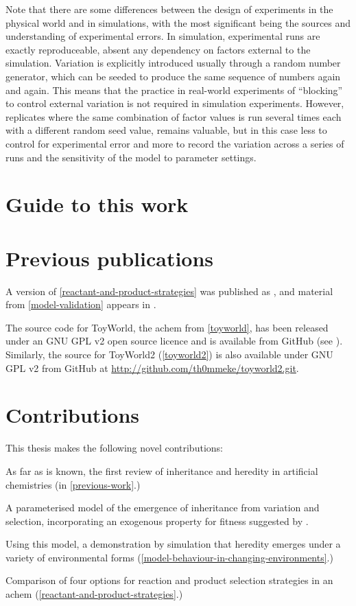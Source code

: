 Note that there are some differences between the design of experiments in the physical world and in simulations, with the most significant being the sources and understanding of experimental errors. In simulation, experimental runs are exactly reproduceable, absent any dependency on factors external to the simulation. Variation is explicitly introduced usually through a random number generator, which can be seeded to produce the same sequence of numbers again and again. This means that the practice in real-world experiments of ``blocking'' to control external variation is not required in simulation experiments. However, \gls{replicate}s where the same combination of factor values is run several times each with a different random seed value, remains valuable, but in this case less to control for experimental error and more to record the variation across a series of runs and the sensitivity of the model to parameter settings.

\section{Guide to this work}


\section{Previous publications}\label{previous-publications}

A version of \cref{reactant-and-product-strategies} was published as \textcite{Young2015}, and material from \cref{model-validation} appears in \textcite{Young2013}.

The source code for ToyWorld, the \gls{achem} from \cref{toyworld}, has been released under an GNU GPL v2 open source licence and is available from GitHub (see \cite{toyworld}). Similarly, the source for ToyWorld2 (\cref{toyworld2}) is also available under GNU GPL v2 from GitHub at \url{http://github.com/th0mmeke/toyworld2.git}.

\section{Contributions}\label{contributions}

This thesis makes the following novel contributions:

\begin{compactenum}
\item As far as is known, the first review of inheritance and heredity in artificial chemistries (in \cref{previous-work}.)
\item A parameterised model of the emergence of inheritance from variation and selection, incorporating an exogenous property for fitness suggested by \textcite{Bourrat2015}.
\item Using this model, a demonstration by simulation that heredity emerges under a variety of environmental forms (\cref{model-behaviour-in-changing-environments}.)
\item Comparison of four options for reaction and product selection strategies in an \gls{achem} (\cref{reactant-and-product-strategies}.)
\end{compactenum}


